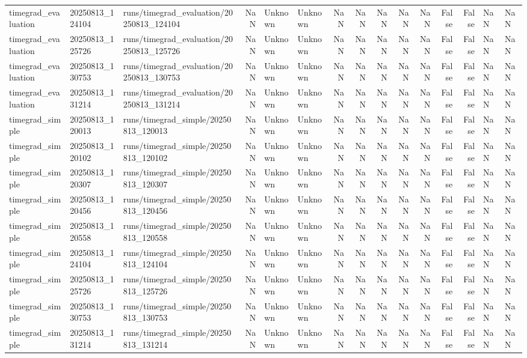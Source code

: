 \begin{tabular}{lllrllrrrrrrrll}
timegrad_evaluation & 20250813_124104 & runs/timegrad_evaluation/20250813_124104 & NaN & Unknown & Unknown & NaN & NaN & NaN & NaN & NaN & False & False & NaN & NaN \\
timegrad_evaluation & 20250813_125726 & runs/timegrad_evaluation/20250813_125726 & NaN & Unknown & Unknown & NaN & NaN & NaN & NaN & NaN & False & False & NaN & NaN \\
timegrad_evaluation & 20250813_130753 & runs/timegrad_evaluation/20250813_130753 & NaN & Unknown & Unknown & NaN & NaN & NaN & NaN & NaN & False & False & NaN & NaN \\
timegrad_evaluation & 20250813_131214 & runs/timegrad_evaluation/20250813_131214 & NaN & Unknown & Unknown & NaN & NaN & NaN & NaN & NaN & False & False & NaN & NaN \\
timegrad_simple & 20250813_120013 & runs/timegrad_simple/20250813_120013 & NaN & Unknown & Unknown & NaN & NaN & NaN & NaN & NaN & False & False & NaN & NaN \\
timegrad_simple & 20250813_120102 & runs/timegrad_simple/20250813_120102 & NaN & Unknown & Unknown & NaN & NaN & NaN & NaN & NaN & False & False & NaN & NaN \\
timegrad_simple & 20250813_120307 & runs/timegrad_simple/20250813_120307 & NaN & Unknown & Unknown & NaN & NaN & NaN & NaN & NaN & False & False & NaN & NaN \\
timegrad_simple & 20250813_120456 & runs/timegrad_simple/20250813_120456 & NaN & Unknown & Unknown & NaN & NaN & NaN & NaN & NaN & False & False & NaN & NaN \\
timegrad_simple & 20250813_120558 & runs/timegrad_simple/20250813_120558 & NaN & Unknown & Unknown & NaN & NaN & NaN & NaN & NaN & False & False & NaN & NaN \\
timegrad_simple & 20250813_124104 & runs/timegrad_simple/20250813_124104 & NaN & Unknown & Unknown & NaN & NaN & NaN & NaN & NaN & False & False & NaN & NaN \\
timegrad_simple & 20250813_125726 & runs/timegrad_simple/20250813_125726 & NaN & Unknown & Unknown & NaN & NaN & NaN & NaN & NaN & False & False & NaN & NaN \\
timegrad_simple & 20250813_130753 & runs/timegrad_simple/20250813_130753 & NaN & Unknown & Unknown & NaN & NaN & NaN & NaN & NaN & False & False & NaN & NaN \\
timegrad_simple & 20250813_131214 & runs/timegrad_simple/20250813_131214 & NaN & Unknown & Unknown & NaN & NaN & NaN & NaN & NaN & False & False & NaN & NaN \\
\bottomrule
\end{tabular}
